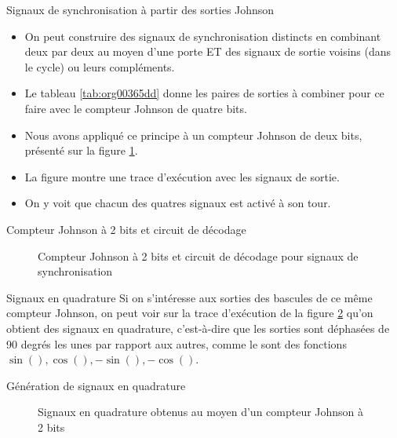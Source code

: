 \documentclass[presentation]{beamer}
\begin{document}
\begin{frame}[label={sec:orgd4285c2}]{Signaux de synchronisation à partir des sorties Johnson}
\begin{itemize}
\item On peut construire des signaux de synchronisation distincts en combinant deux par deux au moyen d'une porte ET des signaux de sortie voisins (dans le cycle) ou leurs compléments.

\item Le tableau \ref{tab:org00365dd} donne les paires de sorties à combiner pour ce faire avec le compteur Johnson de quatre bits.

\item Nous avons appliqué ce principe à un compteur Johnson de deux bits, présenté sur la figure \ref{fig:orgceeec8f}.

\item La figure montre une trace d'exécution avec les signaux de sortie.

\item On y voit que chacun des quatres signaux est activé à son tour.
\end{itemize}
\end{frame}

\begin{frame}[label={sec:orgb728190}]{Compteur Johnson à 2 bits et circuit de décodage}
\begin{figure}[htbp]
\centering

\caption{\label{fig:orgceeec8f}Compteur Johnson à 2 bits et circuit de décodage pour signaux de synchronisation}
\end{figure}
\end{frame}

\begin{frame}[label={sec:org9c502a1}]{Signaux en quadrature}
Si on s'intéresse aux sorties des bascules de ce même compteur
Johnson, on peut voir sur la trace d'exécution de la figure
\ref{fig:org613927d} qu'on obtient des signaux en \alert{quadrature},
c'est-à-dire que les sorties sont déphasées de 90 degrés les unes par
rapport aux autres, comme le sont des fonctions \(\sin(), \cos(),
-\sin(), -\cos()\).
\end{frame}

\begin{frame}[label={sec:org67b4b10}]{Génération de signaux en quadrature}
\begin{figure}[htbp]
\centering

\caption{\label{fig:org613927d}Signaux en quadrature obtenus au moyen d'un compteur Johnson à 2 bits}
\end{figure} 
\end{frame}
\end{document}
